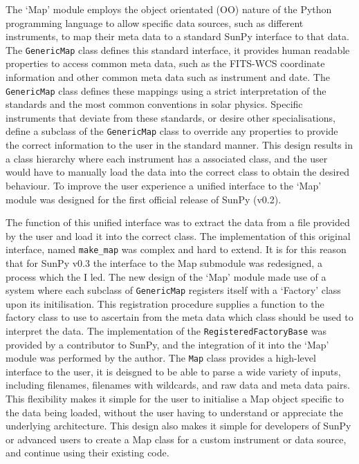 \documentclass[a4paper,12pt,fourier,authoryear,custommargin]{Classes/PhDThesisPSnPDF}
\begin{document}
The `Map' module employs the object orientated (OO) nature of the Python programming language to allow specific data sources, such as different instruments, to map their meta data to a standard SunPy interface to that data.
The \verb|GenericMap| class defines this standard interface, it provides human readable properties to access common meta data, such as the FITS-WCS coordinate information and other common meta data such as instrument and date.
The \verb|GenericMap| class defines these mappings using a strict interpretation of the standards and the most common conventions in solar physics.
Specific instruments that deviate from these standards, or desire other specialisations, define a subclass of the \verb|GenericMap| class to override any properties to provide the correct information to the user in the standard manner.
This design results in a class hierarchy where each instrument has a associated class, and the user would have to manually load the data into the correct class to obtain the desired behaviour.
To improve the user experience a unified interface to the `Map' module was designed for the first official release of SunPy (v0.2).

The function of this unified interface was to extract the data from a file provided by the user and load it into the correct class.
The implementation of this original interface, named \verb|make_map| was complex and hard to extend.
It is for this reason that for SunPy v0.3 the interface to the Map submodule was redesigned, a process which the I led.
The new design of the `Map' module made use of a system where each subclass of \verb|GenericMap| registers itself with a `Factory' class upon its initilisation.
This registration procedure supplies a function to the factory class to use to ascertain from the meta data which class should be used to interpret the data.
The implementation of the \verb|RegisteredFactoryBase| was provided by a contributor to SunPy, and the integration of it into the `Map' module was performed by the author.
The \verb|Map| class provides a high-level interface to the user, it is deisgned to be able to parse a wide variety of inputs, including filenames, filenames with wildcards, and raw data and meta data pairs.
This flexibility makes it simple for the user to initialise a Map object specific to the data being loaded, without the user having to understand or appreciate the underlying architecture.
This design also makes it simple for developers of SunPy or advanced users to create a Map class for a custom instrument or data source, and continue using their existing code.
\end{document}
